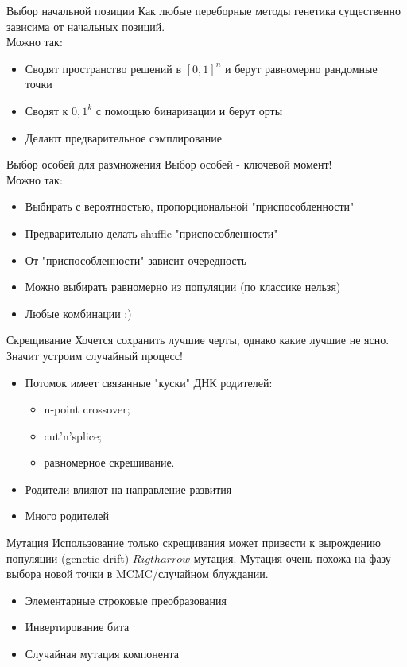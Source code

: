 \documentclass[14pt, fleqn, xcolor={dvipsnames, table}]{beamer}
\begin{document}
\begin{frame}{Выбор начальной позиции}
Как любые переборные методы генетика существенно зависима от начальных позиций. \\
Можно так:
\begin{itemize}
  \item Сводят пространство решений в $[0,1]^n$ и берут равномерно рандомные точки
  \item Сводят к ${0,1}^k$ с помощью бинаризации и берут орты
  \item Делают предварительное сэмплирование
\end{itemize}
\end{frame}

\begin{frame}{Выбор особей для размножения}
Выбор особей - ключевой момент! \\
Можно так:
\begin{itemize}
  \item Выбирать с вероятностью, пропорциональной "приспособленности"
  \item Предварительно делать shuffle "приспособленности"
  \item От "приспособленности" зависит очередность
  \item Можно выбирать равномерно из популяции (по классике нельзя)
  \item Любые комбинации :)
\end{itemize}
\end{frame}

\begin{frame}{Скрещивание}
Хочется сохранить лучшие черты, однако какие лучшие не ясно. Значит устроим случайный процесс!
\begin{itemize}
  \item Потомок имеет связанные "куски" ДНК родителей:
  \begin{itemize}
    \item n-point crossover;
    \item cut'n'splice;
    \item равномерное скрещивание.
  \end{itemize}
  \item Родители влияют на направление развития
  \item Много родителей
\end{itemize}
\end{frame}

\begin{frame}{Мутация}
Использование только скрещивания может привести к вырождению популяции (genetic drift) $Rigtharrow$ мутация.
Мутация очень похожа на фазу выбора новой точки в MCMC/случайном блуждании.
\begin{itemize}
  \item Элементарные строковые преобразования
  \item Инвертирование бита
  \item Случайная мутация компонента
\end{itemize}
\end{frame}
\end{document}
